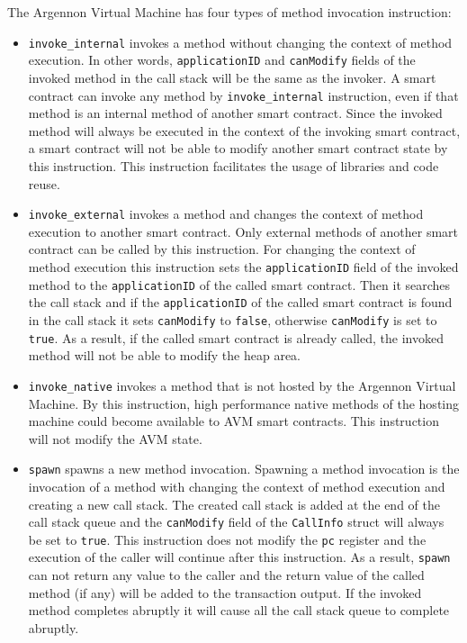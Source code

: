 \documentclass[11pt, a4paper]{report}
\begin{document}
    The Argennon Virtual Machine has four types of method invocation instruction:
    \begin{itemize}
        \item \texttt{invoke\_internal} invokes a method without changing the context of method execution. In other
        words, \texttt{applicationID} and \texttt{canModify} fields of the invoked method in the
        call stack will be the same as the invoker.
        A smart contract can invoke any method by \texttt{invoke\_internal} instruction, even if that method is an
        internal method of another smart contract. Since the invoked method will always be executed in the context of
        the invoking smart contract, a smart contract will not be able to modify another smart contract state by
        this instruction. This instruction facilitates the usage of libraries and code reuse.
        \item \texttt{invoke\_external} invokes a method and changes the context of method execution to another
        smart contract. Only external methods of another smart contract can be called by this instruction. For changing
        the context of method execution this instruction sets the \texttt{applicationID} field of the invoked method
        to the \texttt{applicationID} of the called smart contract. Then it searches the call stack and if
        the \texttt{applicationID} of the called smart contract is found in the call stack it sets \texttt{canModify}
        to \texttt{false}, otherwise \texttt{canModify} is set to \texttt{true}. As a result, if the
        called smart contract is already called, the invoked method will not be able to modify the heap area.
        \item \texttt{invoke\_native} invokes a method that is not hosted by the Argennon Virtual Machine. By this
        instruction, high performance native methods of the hosting machine could become available to AVM smart
        contracts. This instruction will not modify the AVM state.
        \item \texttt{spawn} spawns a new method invocation. Spawning a method invocation is the invocation of a method
        with changing the context of method execution and creating a new call stack. The created call stack is added at
        the end of the call stack queue and the \texttt{canModify} field of the \texttt{CallInfo} struct will always
        be set to \texttt{true}. This instruction does not modify the \texttt{pc} register and the execution of the
        caller will continue after this instruction. As a result, \texttt{spawn} can not return
        any value to the caller and the return value of the called method (if any) will be added
        to the transaction output. If the invoked method completes abruptly it will cause all the call stack queue to
        complete abruptly.
    \end{itemize}
\end{document}
